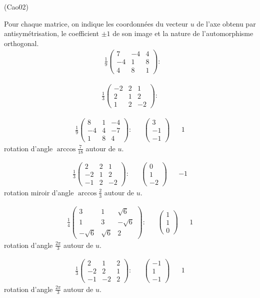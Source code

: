 \begin{tiny}(Cao02)\end{tiny} Pour chaque matrice, on indique les coordonnées du vecteur $u$ de l'axe obtenu par antisymétrisation, le coefficient $\pm 1$ de son image et la nature de l'automorphisme orthogonal.
\begin{align*}
&\frac{1}{9}\begin{pmatrix}
7 & -4 & 4 \\ 
-4 & 1 & 8 \\ 
4 & 8 & 1
\end{pmatrix}:
\end{align*}

\begin{align*}
\frac{1}{3}\begin{pmatrix}
-2 & 2 & 1 \\ 
2 & 1 & 2 \\ 
1 & 2 & -2
\end{pmatrix}:
\end{align*}

\begin{align*}
\frac{1}{9}\begin{pmatrix}
8 & 1 & -4 \\ 
-4 & 4 & -7 \\ 
1 & 8 & 4
\end{pmatrix}:
& & \begin{pmatrix}
3 \\ -1 \\ -1   
\end{pmatrix}
& &1
\end{align*}
rotation d'angle $\arccos \frac{7}{18}$ autour de $u$.

\begin{align*}
\frac{1}{3}\begin{pmatrix}
2 & 2 & 1 \\ 
-2 & 1 & 2 \\ 
-1 & 2 & -2
\end{pmatrix}:
& &\begin{pmatrix}
 0 \\ 1 \\ -2  
\end{pmatrix}
& &-1
\end{align*}
rotation miroir d'angle $\arccos \frac{2}{3}$ autour de $u$.

\begin{align*}
\frac{1}{4}\begin{pmatrix}
3 & 1 & \sqrt{6} \\ 
1 & 3 &  -\sqrt{6}\\ 
-\sqrt{6} & \sqrt{6} & 2
\end{pmatrix}:
& &\begin{pmatrix}
1 \\ 1 \\ 0  
\end{pmatrix}
& &1
\end{align*}
rotation d'angle $\frac{2\pi}{3}$ autour de $u$.

\begin{align*}
\frac{1}{3}
\begin{pmatrix}
2&1&2\\-2&2&1\\-1&-2&2 
\end{pmatrix}:
& &\begin{pmatrix}
-1 \\ 1 \\ -1  
\end{pmatrix}
& &1 
\end{align*}
rotation d'angle $\frac{2\pi}{3}$ autour de $u$. 